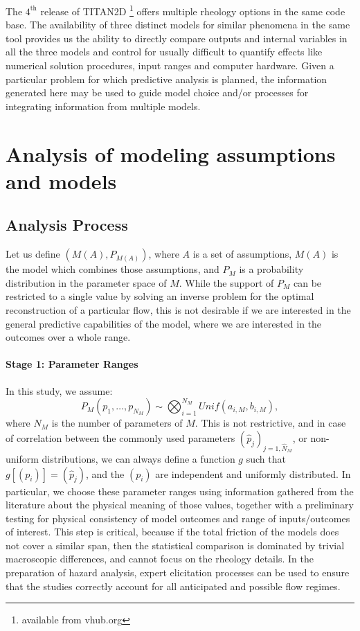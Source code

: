 \documentclass{article}
\begin{document}
{The $\mathrm{4^{\mathrm{th}}}$ release of TITAN2D \footnote{available from vhub.org} offers multiple rheology options in the same code base. The availability of three distinct models for similar phenomena in the same tool provides us the ability to directly compare  outputs and internal variables in all the three models and control for usually difficult to quantify effects like numerical solution procedures, input ranges and computer hardware. Given a particular problem for which predictive analysis is planned, the information generated here may be used to guide model choice and/or processes for integrating information from multiple models.}

\section{Analysis of modeling assumptions and models }
\subsection{Analysis Process}
Let us define $\left(M(A), P_{M(A)}\right)$, where $A$ is a set of assumptions, $M(A)$ is the model which combines those assumptions, and $P_M$ is a probability distribution in the parameter space of $M$. While the support of $P_M$ can be restricted to a single value by solving an inverse problem for the optimal reconstruction of a particular flow, this is not desirable if we are interested in the general predictive capabilities of the model, where we are interested in the outcomes over a whole range.

\paragraph{Stage 1: Parameter Ranges} In this study, we assume:
$$P_M\left(p_1,\dots,p_{N_M}\right)\sim \bigotimes_{i=1}^{N_M} Unif(a_{i,M},b_{i,M}),$$
where $N_M$ is the number of parameters of $M$. This is not restrictive, and in case of correlation between the commonly used parameters $(\hat p_j)_{j=1,\hat N_M}$, or non-uniform distributions, we can always define a function $g$ such that $g[(p_i)]=(\hat p_j)$, and the $(p_i)$ are independent and uniformly distributed. In particular, we choose these parameter ranges using information gathered from the literature about the physical meaning of those values, together with a preliminary testing for physical consistency of model outcomes and range of inputs/outcomes of interest. {This step is critical, because if the total friction of the models does not cover a similar span, then the statistical comparison is dominated by trivial macroscopic differences, and cannot focus on the rheology details.}  In the preparation of hazard analysis, expert elicitation processes can be
used to ensure that the studies correctly account for all anticipated and possible flow regimes.
%
\end{document}
